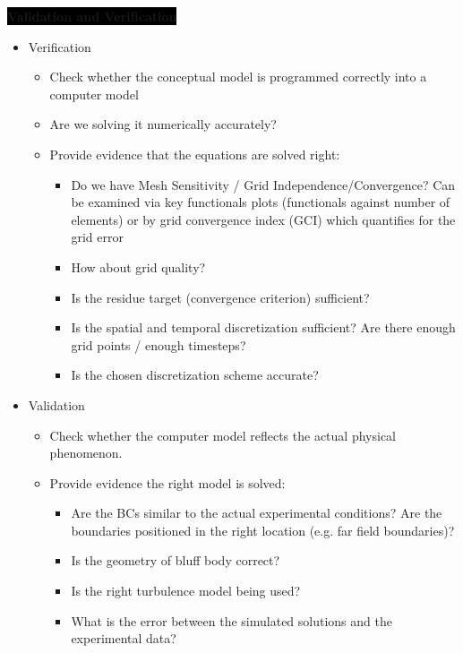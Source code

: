 \colorbox{black}{\textbf{\color{white}Validation and Verification}}
\begin{itemize}
    \item  Verification
    \begin{itemize}
        \item Check whether the conceptual model is programmed correctly into a computer model
        \item Are we solving it numerically accurately?
        \item Provide evidence that the equations are solved right:
        \begin{itemize}
            \item Do we have Mesh Sensitivity / Grid Independence/Convergence? Can be examined via key functionals plots (functionals against number of elements) or by grid convergence index (GCI) which quantifies for the grid error
            \item How about grid quality? 
            \item Is the residue target (convergence criterion) sufficient?
            \item Is the spatial and temporal discretization sufficient? Are there enough grid points / enough timesteps?
            \item Is the chosen discretization scheme accurate?
        \end{itemize}
    \end{itemize}
    \item Validation
    \begin{itemize}
        \item Check whether the computer model reflects the actual physical phenomenon.
        \item Provide evidence the right model is solved:
        \begin{itemize}
            \item Are the BCs similar to the actual experimental conditions? Are the boundaries positioned in the right location (e.g. far field boundaries)?
            \item Is the geometry of bluff body correct?
            \item Is the right turbulence model being used?
            \item What is the error between the simulated solutions and the experimental data?
        \end{itemize}
    \end{itemize}
\end{itemize}

